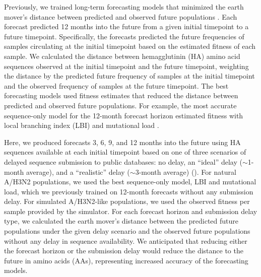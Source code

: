\documentclass[9pt,lineno]{elife}
\begin{document}
Previously, we trained long-term forecasting models that minimized the earth mover's distance \citep{Rubner1998} between predicted and observed future populations \citep{Huddleston2020}.
Each forecast predicted 12 months into the future from a given initial timepoint to a future timepoint.
Specifically, the forecasts predicted the future frequencies of samples circulating at the initial timepoint based on the estimated fitness of each sample.
We calculated the distance between hemagglutinin (HA) amino acid sequences observed at the initial timepoint and the future timepoint, weighting the distance by the predicted future frequency of samples at the initial timepoint and the observed frequency of samples at the future timepoint.
The best forecasting models used fitness estimates that reduced the distance between predicted and observed future populations.
For example, the most accurate sequence-only model for the 12-month forecast horizon estimated fitness with local branching index (LBI) \citep{Neher:2014eu} and mutational load \citep{Luksza:2014hj}.

Here, we produced forecasts 3, 6, 9, and 12 months into the future using HA sequences available at each initial timepoint based on one of three scenarios of delayed sequence submission to public databases: no delay, an ``ideal'' delay ($\sim$1-month average), and a ``realistic'' delay ($\sim$3-month average) ().
For natural A/H3N2 populations, we used the best sequence-only model, LBI and mutational load, which we previously trained on 12-month forecasts without any submission delay.
For simulated A/H3N2-like populations, we used the observed fitness per sample provided by the simulator.
For each forecast horizon and submission delay type, we calculated the earth mover's distance between the predicted future populations under the given delay scenario and the observed future populations without any delay in sequence availability.
We anticipated that reducing either the forecast horizon or the submission delay would reduce the distance to the future in amino acids (AAs), representing increased accuracy of the forecasting models.
\end{document}
